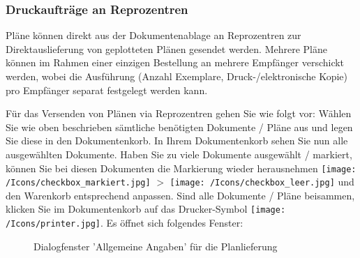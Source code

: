 \subsubsection{Druckaufträge an Reprozentren}
\label{bkm:Ref20170609127}

Pläne können direkt aus der Dokumentenablage an Reprozentren zur Direktauslieferung von geplotteten Plänen gesendet werden. Mehrere Pläne können im Rahmen einer einzigen Bestellung an mehrere Empfänger verschickt werden, wobei die Ausführung (Anzahl Exemplare, Druck-/elektronische Kopie) pro Empfänger separat festgelegt werden kann.

\vspace{\baselineskip}

Für das Versenden von Plänen via Reprozentren gehen Sie wie folgt vor: Wählen Sie wie oben beschrieben sämtliche benötigten Dokumente / Pläne aus und legen Sie diese in den Dokumentenkorb. In Ihrem Dokumentenkorb sehen Sie nun alle ausgewählten Dokumente. Haben Sie zu viele Dokumente ausgewählt / markiert, können Sie bei diesen Dokumenten die Markierung wieder herausnehmen \texttt{[image: /Icons/checkbox\_markiert.jpg]} $ > $ \texttt{[image: /Icons/checkbox\_leer.jpg]} und den Warenkorb entsprechend anpassen. Sind alle Dokumente / Pläne beisammen, klicken Sie im Dokumentenkorb auf das Drucker-Symbol \texttt{[image: /Icons/printer.jpg]}. Es öffnet sich folgendes Fenster:

\begin{figure}[H]
\caption{Dialogfenster 'Allgemeine Angaben' für die Planlieferung}
\end{figure}

